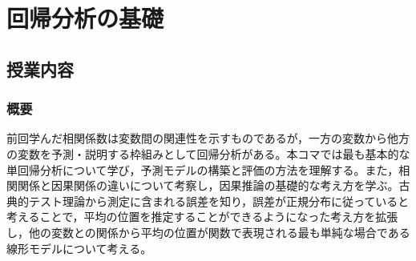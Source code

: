 \section{回帰分析の基礎}
\label{b07_Regression}

\subsection{授業内容}

\subsubsection{概要}
前回学んだ相関係数は変数間の関連性を示すものであるが，一方の変数から他方の変数を予測・説明する枠組みとして回帰分析がある。本コマでは最も基本的な単回帰分析について学び，予測モデルの構築と評価の方法を理解する。また，相関関係と因果関係の違いについて考察し，因果推論の基礎的な考え方を学ぶ。古典的テスト理論から測定に含まれる誤差を知り，誤差が正規分布に従っていると考えることで，平均の位置を推定することができるようになった考え方を拡張し，他の変数との関係から平均の位置が関数で表現される最も単純な場合である線形モデルについて考える。

